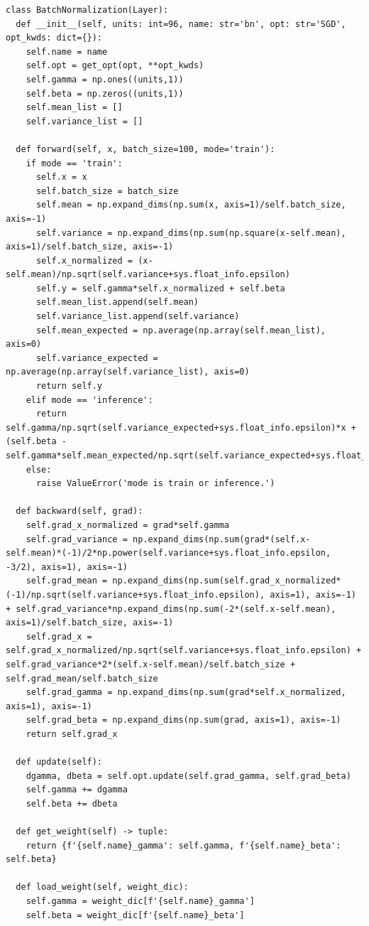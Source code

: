 \documentclass[platex,dvipdfmx]{jsarticle}
\begin{document}
\begin{lstlisting}[caption=ex\_advanced.py, label=BatchNormalization]
class BatchNormalization(Layer):
  def __init__(self, units: int=96, name: str='bn', opt: str='SGD', opt_kwds: dict={}):
    self.name = name
    self.opt = get_opt(opt, **opt_kwds)
    self.gamma = np.ones((units,1))
    self.beta = np.zeros((units,1))
    self.mean_list = []
    self.variance_list = []

  def forward(self, x, batch_size=100, mode='train'):
    if mode == 'train':
      self.x = x
      self.batch_size = batch_size
      self.mean = np.expand_dims(np.sum(x, axis=1)/self.batch_size, axis=-1)
      self.variance = np.expand_dims(np.sum(np.square(x-self.mean), axis=1)/self.batch_size, axis=-1)
      self.x_normalized = (x-self.mean)/np.sqrt(self.variance+sys.float_info.epsilon)
      self.y = self.gamma*self.x_normalized + self.beta
      self.mean_list.append(self.mean)
      self.variance_list.append(self.variance)
      self.mean_expected = np.average(np.array(self.mean_list), axis=0)
      self.variance_expected = np.average(np.array(self.variance_list), axis=0)
      return self.y
    elif mode == 'inference':
      return self.gamma/np.sqrt(self.variance_expected+sys.float_info.epsilon)*x + (self.beta - self.gamma*self.mean_expected/np.sqrt(self.variance_expected+sys.float_info.epsilon))
    else:
      raise ValueError('mode is train or inference.')

  def backward(self, grad):
    self.grad_x_normalized = grad*self.gamma
    self.grad_variance = np.expand_dims(np.sum(grad*(self.x-self.mean)*(-1)/2*np.power(self.variance+sys.float_info.epsilon, -3/2), axis=1), axis=-1)
    self.grad_mean = np.expand_dims(np.sum(self.grad_x_normalized*(-1)/np.sqrt(self.variance+sys.float_info.epsilon), axis=1), axis=-1) + self.grad_variance*np.expand_dims(np.sum(-2*(self.x-self.mean), axis=1)/self.batch_size, axis=-1)
    self.grad_x = self.grad_x_normalized/np.sqrt(self.variance+sys.float_info.epsilon) + self.grad_variance*2*(self.x-self.mean)/self.batch_size + self.grad_mean/self.batch_size
    self.grad_gamma = np.expand_dims(np.sum(grad*self.x_normalized, axis=1), axis=-1)
    self.grad_beta = np.expand_dims(np.sum(grad, axis=1), axis=-1)
    return self.grad_x

  def update(self):
    dgamma, dbeta = self.opt.update(self.grad_gamma, self.grad_beta)
    self.gamma += dgamma
    self.beta += dbeta

  def get_weight(self) -> tuple:
    return {f'{self.name}_gamma': self.gamma, f'{self.name}_beta': self.beta}

  def load_weight(self, weight_dic):
    self.gamma = weight_dic[f'{self.name}_gamma']
    self.beta = weight_dic[f'{self.name}_beta']
\end{lstlisting}
\end{document}
